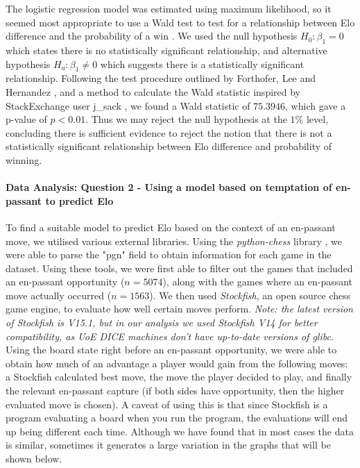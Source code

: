 \documentclass[10pt,a4paper,twocolumn]{article}
\begin{document}
The logistic regression model was estimated using maximum likelihood, so it seemed most appropriate to use a Wald test to test for a relationship between Elo difference and the probability of a win \cite{WaldTest}. We used the null hypothesis $H_{0}: \beta_{1} = 0$ which states there is no statistically significant relationship, and alternative hypothesis $H_{a}: \beta_{1} \neq 0$ which suggests there is a statistically significant relationship. Following the test procedure outlined by Forthofer, Lee and Hernandez \cite{WaldTest}, and a method to calculate the Wald statistic inspired by StackExchange user j\_sack \cite{StackExchangeWaldTest}, we found a Wald statistic of $75.3946$, which gave a p-value of $p<0.01$. Thus we may reject the null hypothesis at the $1\%$ level, concluding there is sufficient evidence to reject the notion that there is not a statistically significant relationship between Elo difference and probability of winning. \newline



\paragraph{Data Analysis: Question 2 - Using a model based on temptation of en-passant to predict Elo}
To find a suitable model to predict Elo based on the context of an en-passant move, we utilised various external libraries. Using the \textit{python-chess} library \cite{python-chess}, we were able to parse the "pgn" field to obtain information for each game in the dataset. Using these tools, we were first able to filter out the games that included an en-passant opportunity ($n=5074$), along with the games where an en-passant move actually occurred ($n=1563$). We then used \textit{Stockfish}\cite{StockFish}, an open source chess game engine, to evaluate how well certain moves perform. \textit{Note: the latest version of Stockfish is V15.1, but in our analysis we used Stockfish V14 for better compatibility, as UoE DICE machines don't have up-to-date versions of glibc}. Using the board state right before an en-passant opportunity, we were able to obtain how much of an advantage a player would gain from the following moves: a Stockfish calculated best move, the move the player decided to play, and finally the relevant en-passant capture (if both sides have opportunity, then the higher evaluated move is chosen). A caveat of using this is that since Stockfish is a program evaluating a board when you run the program, the evaluations will end up being different each time. Although we have found that in most cases the data is similar, sometimes it generates a large variation in the graphs that will be shown below. \newline
\end{document}
